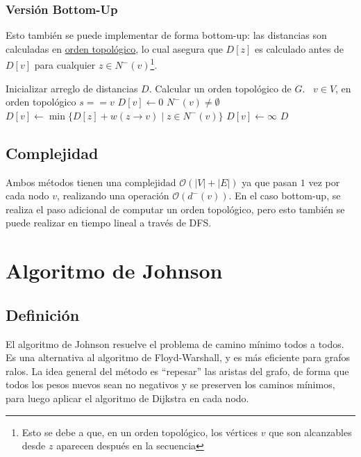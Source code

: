 \documentclass[a4paper]{report}
\newcommand{\BigO}[1]{\ensuremath{\mathcal{O}(#1)}}
\newcommand{\Each}{\kw{each}\ }
\begin{document}
\subsubsection{Versión Bottom-Up}

Esto también se puede implementar de forma bottom-up: las distancias son calculadas en \hyperref[orden-topologico]{orden topológico}, lo cual asegura que $D[z]$ es calculado antes de $D[v]$ para cualquier $z \in N^-(v)$\footnote{Esto se debe a que, en un orden topológico, los vértices $v$ que son alcanzables desde $z$ aparecen después en la secuencia}.

\begin{codebox}
    \li Inicializar arreglo de distancias $D$.
    \li Calcular un orden topológico de $G$.
    \li \For \Each $v \in V$, en orden topológico \Do
    \li \If $s == v$ \Then
    \li $D[v] \gets 0$
    \li \Else
    \li \If $N^-(v) \neq \emptyset$ \Then
    \li $D[v] \gets \min{\{D[z] + w(z \rightarrow v) \mid z \in N^-(v)\}}$
    \li \Else 
    \li $D[v] \gets \infty$
    \End
    \li \Return $D$
\end{codebox}

\subsection{Complejidad}

Ambos métodos tienen una complejidad \BigO{|V| + |E|} ya que pasan $1$ vez por cada nodo $v$, realizando una operación \BigO{d^-(v)}. En el caso bottom-up, se realiza el paso adicional de computar un orden topológico, pero esto también se puede realizar en tiempo lineal a través de DFS.

\section{Algoritmo de Johnson}

\subsection{Definición}

El algoritmo de Johnson resuelve el problema de camino mínimo todos a todos. Es una alternativa al algoritmo de Floyd-Warshall, y es más eficiente para grafos ralos. La idea general del método es ``repesar'' las aristas del grafo, de forma que todos los pesos nuevos sean no negativos y se preserven los caminos mínimos, para luego aplicar el algoritmo de Dijkstra en cada nodo.
\end{document}
